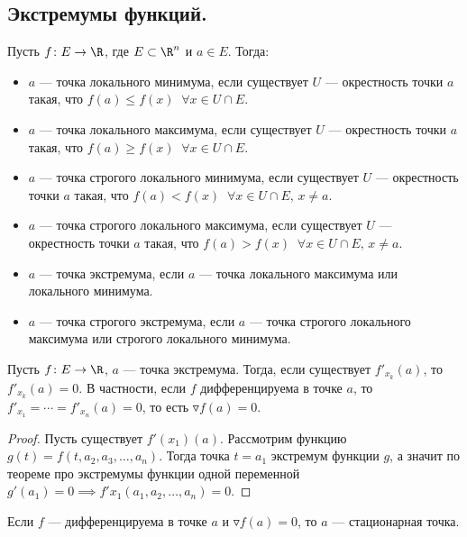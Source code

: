 \subsection*{Экстремумы функций.}
\begin{conj}
  Пусть $f\colon E \to \R$, где $E \subset \R^n$ и $a \in E$. Тогда:
  \begin{itemize}
    \item $a$ --- точка локального минимума, если существует $U$ --- окрестность точки $a$ такая, что $f(a) \leqslant f(x) \;\; \forall x \in U \cap E$.
    \item $a$ --- точка локального максимума, если существует $U$ --- окрестность точки $a$ такая, что $f(a) \geqslant f(x) \;\; \forall x \in U \cap E$.
    \item $a$ --- точка строгого локального минимума, если существует $U$ --- окрестность точки $a$ такая, что $f(a) < f(x) \;\; \forall x \in U \cap E,\, x \neq a$.
    \item $a$ --- точка строгого локального максимума, если существует $U$ --- окрестность точки $a$ такая, что $f(a) > f(x) \;\; \forall x \in U \cap E,\, x \neq a$.
    \item $a$ --- точка экстремума, если $a$ --- точка локального максимума или локального минимума.
    \item $a$ --- точка строгого экстремума, если $a$ --- точка строгого локального максимума или строгого локального минимума.
  \end{itemize}
\end{conj}

\begin{theorem}
  Пусть $f\colon E \to \R$, $a$ --- точка экстремума. Тогда, если существует $f'_{x_k}(a)$, то $f'_{x_k}(a) = 0$. В частности, если $f$ дифференцируема в точке $a$, то $f'_{x_1} = \dotsb = f'_{x_n}(a) = 0$, то есть $\triangledown f(a) = 0$.
\end{theorem}
\begin{proof}
  Пусть существует $f'(x_1)(a)$. Рассмотрим функцию $g(t) = f(t, a_2, a_3, \dotsc, a_n)$. Тогда точка $t = a_1$ экстремум функции $g$, а значит по теореме про экстремумы функции одной переменной $g'(a_1) = 0 \implies f'x_1(a_1, a_2, \dotsc, a_n) = 0$.
\end{proof}

\begin{conj}
  Если $f$ --- дифференцируема в точке $a$ и $\triangledown f(a) = 0$, то $a$ --- стационарная точка.
\end{conj}

